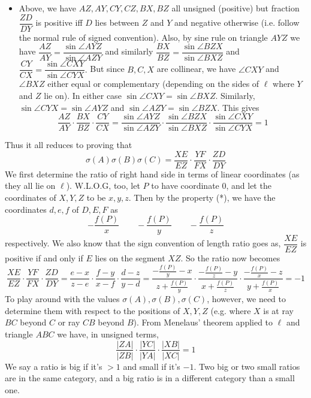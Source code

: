 \documentclass[11pt,a4paper]{article}
\begin{document}
\begin{enumerate}
\begin{itemize}
		\item Above, we have $AZ, AY, CY, CZ, BX, BZ$ all unsigned (positive) but fraction $\dfrac{ZD}{DY}$ is positive iff $D$ lies between $Z$ and $Y$ and negative otherwise (i.e. follow the normal rule of signed convention). Also, by sine rule on triangle $AYZ$ we have $\dfrac{AZ}{AY} = \dfrac{\sin\angle AYZ}{\sin\angle AZY}$ and similarly $\dfrac{BX}{BZ}=\dfrac{\sin\angle BZX}{\sin\angle BXZ}$ and $\dfrac{CY}{CX}=\dfrac{\sin\angle CXY}{\sin\angle CYX}.$ 
		But since $B, C, X$ are collinear, we have $\angle CXY$ and $\angle BXZ$ either equal or complementary (depending on the sides of $\ell$ where $Y$ and $Z$ lie on). In either case $\sin\angle CXY = \sin\angle BXZ$. Similarly, $\sin\angle CYX = \sin\angle AYZ$ and $\sin\angle AZY=\sin\angle BZX$. This gives 
		\[
		\dfrac{AZ}{AY}\cdot\dfrac{BX}{BZ}\cdot\dfrac{CY}{CX}=\dfrac{\sin\angle AYZ}{\sin\angle AZY}\cdot\dfrac{\sin\angle BZX}{\sin\angle BXZ}\cdot\dfrac{\sin\angle CXY}{\sin\angle CYX}=1
		\]
		
	\end{itemize}
	Thus it all reduces to proving that 
	\[\sigma(A)\sigma(B)\sigma(C) = \dfrac{XE}{EZ}\cdot\dfrac{YF}{FX}\cdot\dfrac{ZD}{DY}
	\]
	We first determine the ratio of right hand side in terms of linear coordinates (as they all lie on $\ell$). W.L.O.G, too, let $P$ to have coordinate 0, and let the coordinates of $X, Y, Z$ to be $x, y, z$. 
	Then by the property (*), we have the coordinates $d, e, f$ of $D, E, F$ as 
	\[
	-\dfrac{f(P)}{x}\qquad -\dfrac{f(P)}{y}\qquad -\dfrac{f(P)}{z}
	\]
	respectively. We also know that the sign convention of length ratio goes as, $\dfrac{XE}{EZ}$ is positive if and only if $E$ lies on the segment $XZ$. So the ratio now becomes 
	\[
	\dfrac{XE}{EZ}\cdot\dfrac{YF}{FX}\cdot\dfrac{ZD}{DY}
	=\dfrac{e-x}{z-e}\cdot\dfrac{f-y}{x-f}\cdot\dfrac{d-z}{y-d}
	=\dfrac{-\frac{f(P)}{y}-x}{z+\frac{f(P)}{y}}\cdot\dfrac{-\frac{f(P)}{z}-y}{x+\frac{f(P)}{z}}\cdot\dfrac{-\frac{f(P)}{x}-z}{y+\frac{f(P)}{x}}
	=-1
	\]
	To play around with the values $\sigma(A), \sigma(B), \sigma(C)$, however, we need to determine them with respect to the positions of $X, Y, Z$ (e.g. where $X$ is at ray $BC$ beyond $C$ or ray $CB$ beyond $B$). From Menelaus' theorem applied to $\ell$ and triangle $ABC$ we have, in unsigned terms, 
	\[
	\dfrac{|ZA|}{|ZB|}\cdot\dfrac{|YC|}{|YA|}\cdot\dfrac{|XB|}{|XC|}=1
	\]
	We say a ratio is big if it's $>1$ and small if it's $-1$. Two big or two small ratios are in the same category, and a big ratio is in a different category than a small one. 
	

\end{enumerate}
\end{document}
